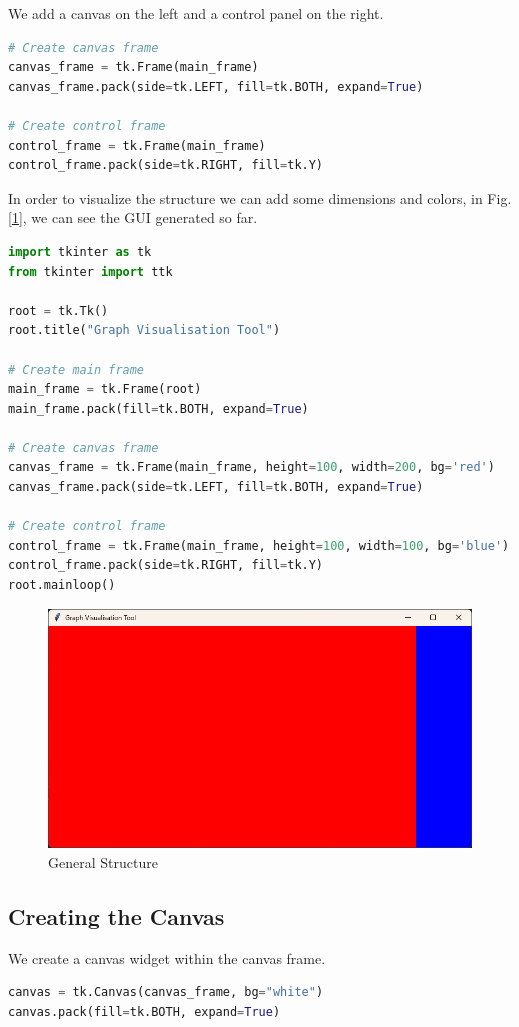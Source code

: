 \documentclass{article}
\begin{document}
We add a canvas on the left and a control panel on the right.

\begin{lstlisting}[language=Python]
# Create canvas frame
canvas_frame = tk.Frame(main_frame)
canvas_frame.pack(side=tk.LEFT, fill=tk.BOTH, expand=True)

# Create control frame
control_frame = tk.Frame(main_frame)
control_frame.pack(side=tk.RIGHT, fill=tk.Y)
\end{lstlisting}

In order to visualize the structure we can add some dimensions and colors, in Fig. [\ref{fig:general structure}], we can see the GUI generated so far.

\begin{lstlisting}[language=Python]
import tkinter as tk
from tkinter import ttk

root = tk.Tk()
root.title("Graph Visualisation Tool")

# Create main frame
main_frame = tk.Frame(root)
main_frame.pack(fill=tk.BOTH, expand=True)

# Create canvas frame
canvas_frame = tk.Frame(main_frame, height=100, width=200, bg='red')
canvas_frame.pack(side=tk.LEFT, fill=tk.BOTH, expand=True)

# Create control frame
control_frame = tk.Frame(main_frame, height=100, width=100, bg='blue')
control_frame.pack(side=tk.RIGHT, fill=tk.Y)
root.mainloop()
\end{lstlisting}

\begin{figure}
    \centering
    \includegraphics[width=0.5\linewidth]{images/general structure.png}
    \caption{General Structure}
    \label{fig:general structure}
\end{figure}

\subsection{Creating the Canvas}
We create a canvas widget within the canvas frame.

\begin{lstlisting}[language=Python]
canvas = tk.Canvas(canvas_frame, bg="white")
canvas.pack(fill=tk.BOTH, expand=True)
\end{lstlisting}
\end{document}
